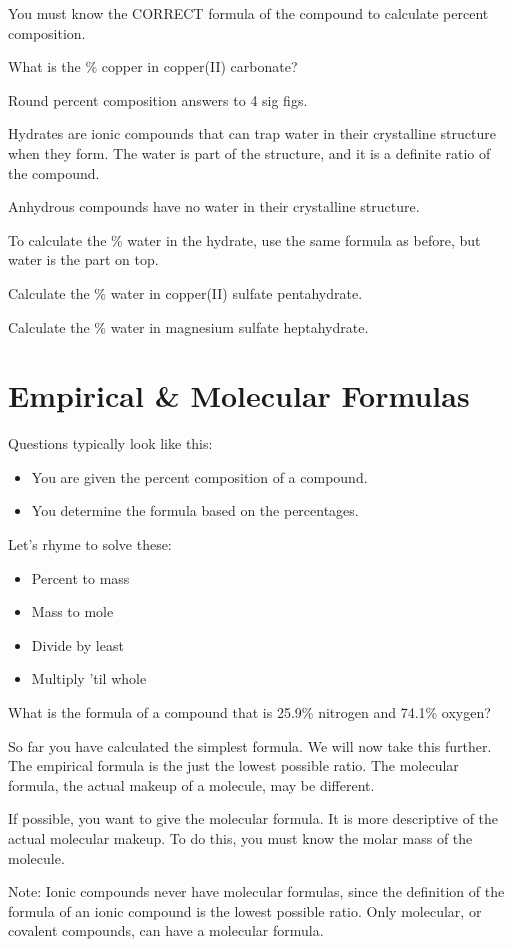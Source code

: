 \documentclass[../hchem.tex]{subfiles}
\begin{document}
You must know the CORRECT formula of the compound to calculate percent composition.

\ex What is the \% copper in copper(II) carbonate? 

Round percent composition answers to 4 sig figs.

Hydrates are ionic compounds that can trap water in their crystalline structure when they form. The water is part of the structure, and it is a definite ratio of the compound.

Anhydrous compounds have no water in their crystalline structure.

To calculate the \% water in the hydrate, use the same formula as before, but water is the part on top.

\ex Calculate the \% water in copper(II) sulfate pentahydrate. 

\ex Calculate the \% water in magnesium sulfate heptahydrate. 
\section{Empirical \& Molecular Formulas}
Questions typically look like this: 
\begin{itemize}
    \item You are given the percent composition of a compound.
    \item You determine the formula based on the percentages.
\end{itemize}

Let's rhyme to solve these:
\begin{itemize}
    \item Percent to mass 
    \item Mass to mole 
    \item Divide by least 
    \item Multiply 'til whole 
\end{itemize}

\ex What is the formula of a compound that is 25.9\% nitrogen and 74.1\% oxygen? 

So far you have calculated the simplest formula. We will now take this further. The empirical formula is the just the 
lowest possible ratio. The molecular formula, the actual makeup of a molecule, may be different.

If possible, you want to give the molecular formula. It is more descriptive of the actual molecular makeup. To do this,
you must know the molar mass of the molecule.

Note: Ionic compounds never have molecular formulas, since the definition of the formula of an ionic compound 
is the lowest possible ratio. Only molecular, or covalent compounds, can have a molecular formula.
\end{document}
